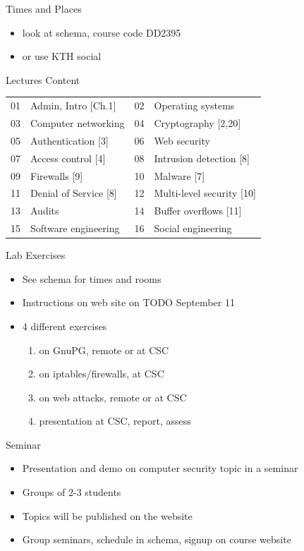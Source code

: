 \documentclass{beamer}
\newcommand{\todo}[1]{\alert{TODO #1}}
\begin{document}
\begin{frame}{Times and Places}
  \begin{itemize}
    \item look at schema, course code DD2395
    \item or use KTH social
  \end{itemize}
\end{frame}

\begin{frame}{Lectures Content}
  \begin{tabular}{cl|cl}
    01 & Admin, Intro [Ch.1] &
    02 & Operating systems \\
    03 & Computer networking &
    04 & Cryptography [2,20] \\
    05 & Authentication [3] &
    06 & Web security \\
    07 & Access control [4] &
    08 & Intrusion detection [8] \\
    09 & Firewalls [9] &
    10 & Malware [7] \\
    11 & Denial of Service [8] &
    12 & Multi-level security [10] \\
    13 & Audits &
    14 & Buffer overflows [11] \\
    15 & Software engineering &
    16 & Social engineering
  \end{tabular}
\end{frame}

\begin{frame}{Lab Exercises}
  \begin{itemize}
    \item See schema for times and rooms
    \item Instructions on web site on \todo{September 11}
    \item 4 different exercises
      \begin{enumerate}
        \item on GnuPG, remote or at CSC
        \item on iptables/firewalls, at CSC
        \item on web attacks, remote or at CSC
        \item presentation at CSC, report, assess
      \end{enumerate}
  \end{itemize}
\end{frame}

\begin{frame}{Seminar}
  \begin{itemize}
    \item Presentation and demo on computer security 
      topic in a seminar
    \item Groups of 2-3 students
    \item Topics will be published on the website
    \item Group seminars, schedule in schema, 
      signup on course website
  \end{itemize}
\end{frame}
\end{document}
